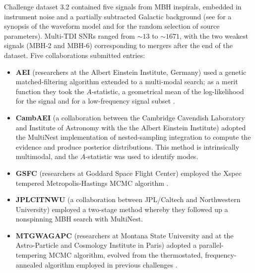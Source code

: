 \documentclass{iopart}
\begin{document}
Challenge dataset 3.2 contained five signals from MBH inspirals, embedded in instrument noise and a partially subtracted Galactic background (see \cite{MLDC3} for a synopsis of the waveform model and for the random selection of source parameters). Multi-TDI SNRs ranged from $\sim 13$ to $\sim 1671$, with the two weakest signals (MBH-2 and MBH-6) corresponding to mergers after the end of the dataset. Five collaborations submitted entries:
%
%
\begin{itemize}
\item \textbf{AEI} (researchers at the Albert Einstein Institute, Germany) used a genetic matched-filtering algorithm extended to a multi-modal search; as a merit function they took the $A$-statistic, a geometrical mean of the log-likelihood for the signal and for a low-frequency signal subset \cite{GAspinbbhFullPaper}.
\item \textbf{CambAEI} (a collaboration between the Cambridge Cavendish Laboratory and Institute of Astronomy with the the Albert Einstein Institute) adopted the MultiNest implementation of nested-sampling integration \cite{MultiNest2} to compute the evidence and produce posterior distributions. This method is intrinsically multimodal, and the $A$-statistic was used to identify modes.
\item \textbf{GSFC} (researchers at Goddard Space Flight Center) employed the Xspec tempered Metropolis-Hastings MCMC algorithm \cite{Xspec}. 
\item \textbf{JPLCITNWU} (a collaboration between JPL/Caltech and Northwestern University) employed a two-stage method whereby they followed up a nonspinning MBH search \cite{JPLCaltech} with MultiNest.
\item \textbf{MTGWAGAPC} (researchers at Montana State University and at the Astro-Particle and Cosmology Institute in Paris) adopted a parallel-tempering MCMC algorithm, evolved from the thermostated, frequency-annealed algorithm employed in previous challenges \cite{SMBHCornishPorter}.
\end{itemize}
\end{document}
